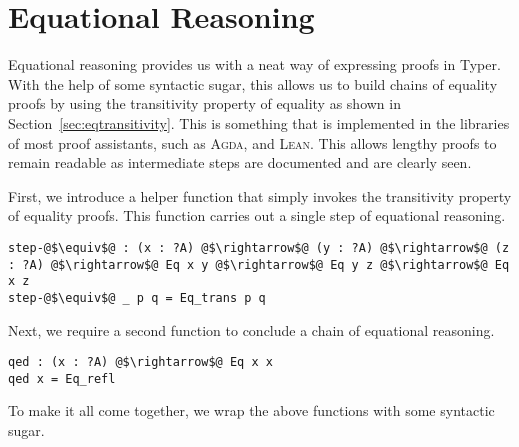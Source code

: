 \documentclass[12pt,twoside,maitrise]{dms}
\theoremstyle{definition}
\numberwithin{equation}{section}
\numberwithin{table}{chapter}
\numberwithin{figure}{chapter}
\def\Agda{\textsc{Agda}\xspace}
\def\Lean{\textsc{Lean}\xspace}
\begin{document}




\def\bibname{References}






\anglais
\appendix

\chapter{Equational Reasoning}\label{section:eqreasoning}
Equational reasoning provides us with a neat way of expressing proofs in Typer.
With the help of some syntactic sugar, this allows us to build chains of
equality proofs by using the transitivity property of equality as shown in
Section~\ref{sec:eqtransitivity}. This is something that is implemented
in the libraries of most proof assistants, such as \Agda{}, and \Lean{}. This
allows lengthy proofs to remain readable as intermediate steps are documented
and are clearly seen.

First, we introduce a helper function that simply invokes the transitivity
property of equality proofs. This function carries out a single step of
equational reasoning.

\begin{verbatim}
step-@$\equiv$@ : (x : ?A) @$\rightarrow$@ (y : ?A) @$\rightarrow$@ (z : ?A) @$\rightarrow$@ Eq x y @$\rightarrow$@ Eq y z @$\rightarrow$@ Eq x z
step-@$\equiv$@ _ p q = Eq_trans p q
\end{verbatim}

Next, we require a second function to conclude a chain of equational reasoning.

\begin{verbatim}
qed : (x : ?A) @$\rightarrow$@ Eq x x
qed x = Eq_refl
\end{verbatim}

To make it all come together, we wrap the above functions with some syntactic
sugar.
\end{document}
